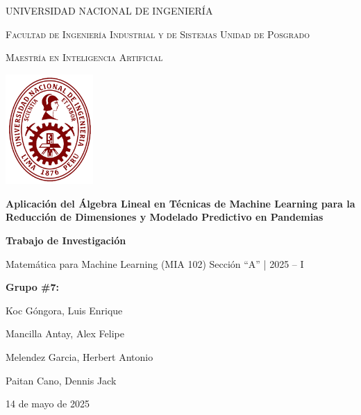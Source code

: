 \documentclass[12pt]{article}
\begin{document}
	
	\begin{titlepage}
		\centering
		{\scshape\Large UNIVERSIDAD NACIONAL DE INGENIERÍA \par}
		{\scshape\large Facultad de Ingeniería Industrial y de Sistemas Unidad de Posgrado \par}
		{\scshape\large Maestría en Inteligencia Artificial \par}
		\vspace{2cm}
		\includegraphics[width=0.25\textwidth]{imagenes/logo.png}\par\vspace{1cm}
		
		{\Huge\bfseries Aplicación del Álgebra Lineal en Técnicas de Machine Learning para la Reducción de Dimensiones y Modelado Predictivo en Pandemias \par}
		\vspace{1.5cm}
		{\large\bfseries Trabajo de Investigación \par}
		\vspace{0.5cm}
		{\large Matemática para Machine Learning (MIA 102) Sección “A” | 2025 – I \par}
		\vspace{0.5cm}
		{\large\bfseries Grupo \#7: \par}
		\vspace{0.5cm}
		{\large Koc Góngora, Luis Enrique \par}
		{\large Mancilla Antay, Alex Felipe \par}
		{\large Melendez Garcia, Herbert Antonio \par}
		{\large Paitan Cano, Dennis Jack \par}
		\vfill
		{\large 14 de mayo de 2025 \par}
	\end{titlepage}
	
	\tableofcontents
	\newpage
	
	\onehalfspacing
	
\end{document}
